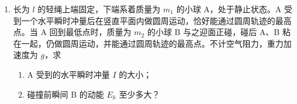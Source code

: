 \documentclass[\gkver]{gaokaozhenti}
\begin{document}
\begin{enumerate}
{$\Delta\Phi=\Delta Bl^{2}$①

由于磁场均匀变化，金属框中产生的电动势是恒定的，有

$E=\frac{\Delta\Phi}{\Delta t}$②

联立①②式，代入数据，解得

$E=0.08\UV$③

（2）设金属框中的电流为 $I$，由闭合电路欧姆定律，有

$I=\frac{E}{R}$④

由图可知，$t=0.05\Us$ 时，磁感应强度为 $B_{1}=0.1\UT$，金属框 ab 边受到的安培力

$F=IlB_{1}$⑤

联立①②④⑤式，代入数据，解得

$F=0.016\UN$⑥

方向垂直于 ab 向左。⑦

（3）在 $t=0$ 到 $t=0.1\Us$ 时间内，金属框中电流的电功率

$P=I^{2}R$⑧

联立①②④⑧式，代入数据，解得

$P=0.064\UW$⑨
}

\item
长为 $l$ 的轻绳上端固定，下端系着质量为 $m_{1}$ 的小球 A，处于静止状态。A 受到一个水平瞬时冲量后在竖直平面内做圆周运动，恰好能通过圆周轨迹的最高点。当 A 回到最低点时，质量为 $m_{2}$ 的小球 B 与之迎面正碰，碰后 A、B 粘在一起，仍做圆周运动，并能通过圆周轨迹的最高点。不计空气阻力，重力加速度为 $g$，求
\begin{enumerate}
	\item
	A 受到的水平瞬时冲量 $I$ 的大小；
	\item
	碰撞前瞬间 B 的动能 $E_{k}$ 至少多大？
\end{enumerate}
\end{enumerate}
\end{document}
